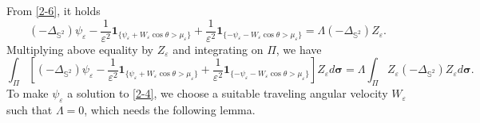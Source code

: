 \documentclass[12pt,reqno]{amsart}
\numberwithin{equation}{section}
\theoremstyle{definition}
\theoremstyle{remark}
\begin{document}
	From \eqref{2-6}, it holds
	\begin{equation*}
		(-\Delta_{\mathbb S^2})\psi_\varepsilon-\frac{1}{\varepsilon^2}\boldsymbol1_{\{\psi_\varepsilon+W_\varepsilon\cos\theta>\mu_\varepsilon\}}+\frac{1}{\varepsilon^2}\boldsymbol1_{\{-\psi_\varepsilon-W_\varepsilon\cos\theta>\mu_\varepsilon\}}=\Lambda(-\Delta_{\mathbb S^2})Z_\varepsilon.
	\end{equation*}
	Multiplying above equality by $Z_\varepsilon$ and integrating on $\Pi$, we have
	\begin{equation*}
		\int_\Pi\left[(-\Delta_{\mathbb S^2})\psi_\varepsilon-\frac{1}{\varepsilon^2}\boldsymbol1_{\{\psi_\varepsilon+W_\varepsilon\cos\theta>\mu_\varepsilon\}}+\frac{1}{\varepsilon^2}\boldsymbol1_{\{-\psi_\varepsilon-W_\varepsilon\cos\theta>\mu_\varepsilon\}}\right]Z_\varepsilon d\boldsymbol\sigma=\Lambda\int_\Pi Z_\varepsilon(-\Delta_{\mathbb S^2})Z_\varepsilon d\boldsymbol \sigma.
	\end{equation*}
	To make $\psi_\varepsilon$ a solution to \eqref{2-4}, we choose a suitable traveling angular velocity $W_\varepsilon$ such that $\Lambda=0$, which needs the following lemma.
	
\end{document}
